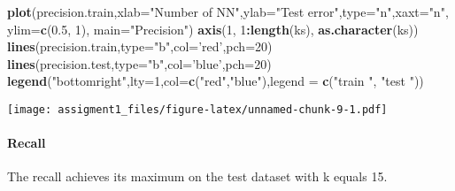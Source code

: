 \documentclass[
]{article}
\newenvironment{Shaded}{\begin{snugshade}}{\end{snugshade}}
\newcommand{\DataTypeTok}[1]{\textcolor[rgb]{0.13,0.29,0.53}{#1}}
\newcommand{\DecValTok}[1]{\textcolor[rgb]{0.00,0.00,0.81}{#1}}
\newcommand{\FloatTok}[1]{\textcolor[rgb]{0.00,0.00,0.81}{#1}}
\newcommand{\KeywordTok}[1]{\textcolor[rgb]{0.13,0.29,0.53}{\textbf{#1}}}
\newcommand{\NormalTok}[1]{#1}
\newcommand{\OperatorTok}[1]{\textcolor[rgb]{0.81,0.36,0.00}{\textbf{#1}}}
\newcommand{\StringTok}[1]{\textcolor[rgb]{0.31,0.60,0.02}{#1}}
\begin{document}
\begin{Shaded}
\begin{Highlighting}[]
\KeywordTok{plot}\NormalTok{(precision.train,}\DataTypeTok{xlab=}\StringTok{"Number of NN"}\NormalTok{,}\DataTypeTok{ylab=}\StringTok{"Test error"}\NormalTok{,}\DataTypeTok{type=}\StringTok{"n"}\NormalTok{,}\DataTypeTok{xaxt=}\StringTok{"n"}\NormalTok{, }\DataTypeTok{ylim=}\KeywordTok{c}\NormalTok{(}\FloatTok{0.5}\NormalTok{, }\DecValTok{1}\NormalTok{),  }\DataTypeTok{main=}\StringTok{"Precision"}\NormalTok{)}
\KeywordTok{axis}\NormalTok{(}\DecValTok{1}\NormalTok{, }\DecValTok{1}\OperatorTok{:}\KeywordTok{length}\NormalTok{(ks), }\KeywordTok{as.character}\NormalTok{(ks))}
\KeywordTok{lines}\NormalTok{(precision.train,}\DataTypeTok{type=}\StringTok{"b"}\NormalTok{,}\DataTypeTok{col=}\StringTok{'red'}\NormalTok{,}\DataTypeTok{pch=}\DecValTok{20}\NormalTok{)}
\KeywordTok{lines}\NormalTok{(precision.test,}\DataTypeTok{type=}\StringTok{"b"}\NormalTok{,}\DataTypeTok{col=}\StringTok{'blue'}\NormalTok{,}\DataTypeTok{pch=}\DecValTok{20}\NormalTok{)}
\KeywordTok{legend}\NormalTok{(}\StringTok{"bottomright"}\NormalTok{,}\DataTypeTok{lty=}\DecValTok{1}\NormalTok{,}\DataTypeTok{col=}\KeywordTok{c}\NormalTok{(}\StringTok{"red"}\NormalTok{,}\StringTok{"blue"}\NormalTok{),}\DataTypeTok{legend =} \KeywordTok{c}\NormalTok{(}\StringTok{"train "}\NormalTok{, }\StringTok{"test "}\NormalTok{))}
\end{Highlighting}
\end{Shaded}

\texttt{[image: assigment1\_files/figure-latex/unnamed-chunk-9-1.pdf]}

\hypertarget{recall}{%
\paragraph{Recall}\label{recall}}

The recall achieves its maximum on the test dataset with k equals 15.
\end{document}
